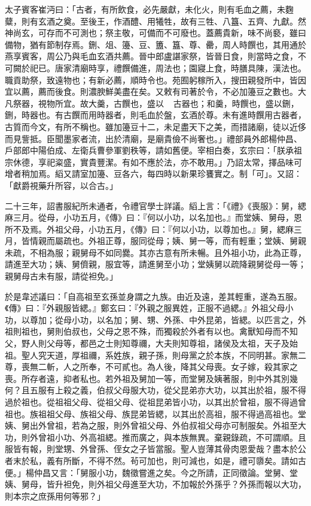 \begin{pinyinscope}
 太子賓客崔沔曰：「古者，有所飲食，必先嚴獻，未化火，則有毛血之薦，未麴糵，則有玄酒之奠。至後王，作酒醴、用犧牲，故有三牲、八簋、五齊、九獻。然神尚玄，可存而不可測也；祭主敬，可備而不可廢也。蓋薦貴新，味不尚褻，雖曰備物，猶有節制存焉。鉶、俎、籩、豆、簠、簋、尊、罍，周人時饌也，其用通於燕享賓客，周公乃與毛血玄酒共薦。晉中郎盧諶家祭，皆晉日食，則當時之食，不可闕於祀已。唐家清廟時享，禮饌備進，周法也；園寢上食，時膳具陳，漢法也。職貢助祭，致遠物也；有新必薦，順時令也。苑囿躬稼所入，搜田親發所中，皆因宜以薦，薦而後食。則濃腴鮮美盡在矣。又敕有司著於令，不必加籩豆之數也。大凡祭器，視物所宜。故大羹，古饌也，盛以，，古器也；和羹，時饌也，盛以鉶，鉶，時器也。有古饌而用時器者，則毛血於盤，玄酒於尊。未有進時饌用古器者，古質而今文，有所不稱也。雖加籩豆十二，未足盡天下之美，而措諸廟，徒以近侈而見訾抵。臣聞墨家者流，出於清廟，是廟貴儉不尚奢也。」禮部員外郎楊仲昌、戶部郎中陽伯成、左衛兵曹參軍劉秩等，請如舊便。宰相白奏，玄宗曰：「朕承祖宗休德，享祀粢盛，實貴豐潔。有如不應於法，亦不敢用。」乃詔太常，擇品味可增者稍加焉。縚又請室加籩、豆各六，每四時以新果珍饔實之。制「可」。又詔：「獻爵視藥升所容，以合古。」



 二十三年，詔書服紀所未通者，令禮官學士詳議。縚上言：「《禮》《喪服》：舅，緦麻三月。從母，小功五月，《傳》曰：『何以小功，以名加也。』而堂姨、舅母，恩所不及焉。外祖父母，小功五月，《傳》曰：『何以小功，以尊加也。』舅，緦麻三月，皆情親而屬疏也。外祖正尊，服同從母；姨、舅一等，而有輕重；堂姨、舅親未疏，不相為服；親舅母不如同爨。其亦古意有所未暢。且外祖小功，此為正尊，請進至大功；姨、舅儕親，服宜等，請進舅至小功；堂姨舅以疏降親舅從母一等；親舅母古未有服，請從袒免。」



 於是韋述議曰：「自高祖至玄孫並身謂之九族。由近及遠，差其輕重，遂為五服。《傳》曰：『外親服皆緦。』鄭玄曰：『外親之服異姓，正服不過緦。』外祖父母小功，以尊加；從母小功，以名加；舅、甥、外孫、中外昆弟，皆緦。以匹言之，外祖則祖也，舅則伯叔也，父母之恩不殊，而獨殺於外者有以也。禽獸知母而不知父，野人則父母等，都邑之士則知尊禰，大夫則知尊祖，諸侯及太祖，天子及始祖。聖人究天道，厚祖禰，系姓族，親子孫，則母黨之於本族，不同明甚。家無二尊，喪無二斬，人之所奉，不可貳也。為人後，降其父母喪。女子嫁，殺其家之喪。所存者遠，抑者私也。若外祖及舅加一等，而堂舅及姨著服，則中外其別幾何？且五服有上殺之義，伯叔父母服大功，從父昆弟亦大功，以其出於祖，服不得過於祖也。從祖祖父母、從祖父母、從祖昆弟皆小功，以其出於曾祖，服不得過曾祖也。族祖祖父母、族祖父母、族昆弟皆緦，以其出於高祖，服不得過高祖也。堂姨、舅出外曾祖，若為之服，則外曾祖父母、外伯叔祖父母亦可制服矣。外祖至大功，則外曾祖小功、外高祖緦。推而廣之，與本族無異。棄親錄疏，不可謂順。且服皆有報，則堂甥、外曾孫、侄女之子皆當服。聖人豈薄其骨肉恩愛哉？盡本於公者末於私，義有所斷，不得不然。茍可加也，則可減也，如是，禮可隳矣。請如古便。」楊仲昌又言：「舅服小功，魏徵嘗進之矣。今之所請，正同徵論。堂舅、堂姨、舅母，皆升袒免，則外祖父母進至大功，不加報於外孫乎？外孫而報以大功，則本宗之庶孫用何等邪？」




\end{pinyinscope}
